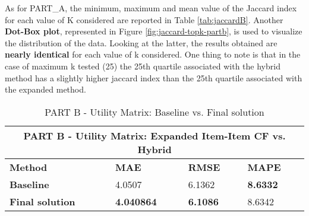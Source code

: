 As for PART\_A, the minimum, maximum and mean value of the Jaccard index for each value of K considered are reported in Table \ref{tab:jaccardB}.
Another \textbf{Dot-Box plot}, represented in Figure \ref{fig:jaccard-topk-partb}, is used to visualize the distribution of the data.
Looking at the latter, the results obtained are \textbf{nearly identical} for each value of k considered. One thing to note is that in the case of maximum k tested (25) the 25th quartile associated with the hybrid method has a slightly higher jaccard index than the 25th quartile associated with the expanded method.


\begin{table}[h!]
    \centering
    \begin{tabular}{ |p{2cm}||p{1.5cm}|p{1.5cm}|p{1.5cm}|  }
         \hline
         \multicolumn{4}{|c|}{PART B - Utility Matrix: Expanded Item-Item CF vs. Hybrid} \\
         \hline
         \textbf{Method}& \textbf{MAE} &\textbf{RMSE} &\textbf{MAPE}\\
         \hline

         \textbf{Baseline} & 4.0507  & 6.1362  &  \textbf{8.6332}\\
         \textbf{Final solution} & \textbf{4.040864} & \textbf{6.1086} & 8.6342 \\
 
         \hline
    \end{tabular}
    \caption{PART B - Utility Matrix: Baseline vs. Final solution}
    \label{tab:part-b-baseline}
\end{table}


